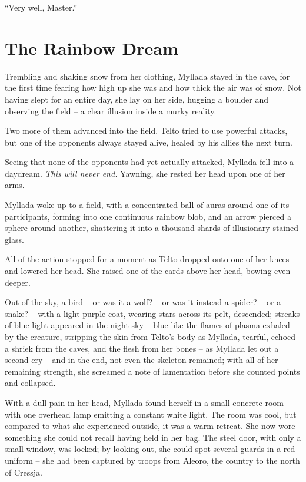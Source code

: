 ``Very well, Master.''

\section{The Rainbow Dream}

Trembling and shaking snow from her clothing, Myllada stayed in the cave, for the first time fearing how high up she was and how thick the air was of snow. Not having slept for an entire day, she lay on her side, hugging a boulder and observing the field -- a clear illusion inside a murky reality.

Two more of them advanced into the field. Telto tried to use powerful attacks, but one of the opponents always stayed alive, healed by his allies the next turn.

Seeing that none of the opponents had yet actually attacked, Myllada fell into a daydream. \emph{This will never end.} Yawning, she rested her head upon one of her arms.

\centeredstars

Myllada woke up to a field, with a concentrated ball of auras around one of its participants, forming into one continuous rainbow blob, and an arrow pierced a sphere around another, shattering it into a thousand shards of illusionary stained glass.

All of the action stopped for a moment as Telto dropped onto one of her knees and lowered her head. She raised one of the cards above her head, bowing even deeper.

Out of the sky, a bird -- or was it a wolf? -- or was it instead a spider? -- or a snake? -- with a light purple coat, wearing stars across its pelt, descended; streaks of blue light appeared in the night sky -- blue like the flames of plasma exhaled by the creature, stripping the skin from Telto's body as Myllada, tearful, echoed a shriek from the caves, and the flesh from her bones -- as Myllada let out a second cry -- and in the end, not even the skeleton remained; with all of her remaining strength, she screamed a note of lamentation before she counted \iformthree{} points and collapsed.

\centeredstars

With a dull pain in her head, Myllada found herself in a small concrete room with one overhead lamp emitting a constant white light. The room was cool, but compared to what she experienced outside, it was a warm retreat. She now wore something she could not recall having held in her bag. The steel door, with only a small window, was locked; by looking out, she could spot several guards in a red uniform -- she had been captured by troops from Aleoro, the country to the north of Cressja.

